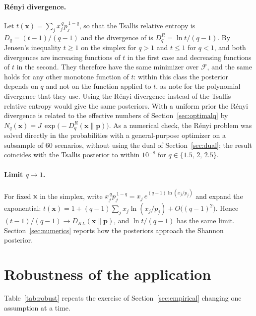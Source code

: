 \documentclass[11pt]{article}
\newcommand{\p}{\mathbf{p}}
\newcommand{\x}{\mathbf{x}}
\begin{document}
\paragraph{R\'enyi divergence.} Let
$t(\x) = \sum_j x_j^{\,q} p_j^{\,1-q}$, so that the Tsallis relative entropy
is $D_q = (t-1)/(q-1)$ and the divergence of \citet{Renyi1961} is
$D^R_q = \ln t/(q-1)$. By Jensen's inequality $t \ge 1$ on the simplex for
$q>1$ and $t \le 1$ for $q<1$, and both divergences are increasing
functions of $t$ in the first case and decreasing functions of $t$ in the
second. They therefore have the same minimizer over $\mathcal{F}$, and the
same holds for any other monotone function of $t$: within this class the
posterior depends on $q$ and not on the function applied to $t$, as
\citet{DeyJuneja2012} note for the polynomial divergence that they use. Using the
R\'enyi divergence instead of the Tsallis relative entropy would give the
same posteriors. With a uniform prior the R\'enyi divergence is related to the effective
numbers of Section~\ref{sec:optimalq} by $N_q(\x) = J\,\exp\!\big(-D^R_q(\x\|\p)\big)$.
As a numerical check, the R\'enyi problem was solved directly in the
probabilities with a general-purpose optimizer on a subsample of 60
scenarios, without using the dual of Section~\ref{sec:dual}; the result
coincides with the Tsallis posterior to within $10^{-8}$ for
$q \in \{1.5,\, 2,\, 2.5\}$.

\paragraph{Limit $q \to 1$.} For fixed $\x$ in the simplex, write
$x_j^{\,q} p_j^{\,1-q} = x_j\, e^{(q-1)\ln(x_j/p_j)}$ and expand the
exponential:
$t(\x) = 1 + (q-1)\sum_j x_j \ln(x_j/p_j) + O\big((q-1)^2\big)$. Hence
$(t-1)/(q-1) \to D_{KL}(\x\|\p)$, and $\ln t/(q-1)$ has the same limit.
Section~\ref{sec:numerics} reports how the posteriors approach the Shannon
posterior.

\section{Robustness of the application}\label{app:robust}

Table~\ref{tab:robust} repeats the exercise of
Section~\ref{sec:empirical} changing one assumption at a time.
\end{document}
